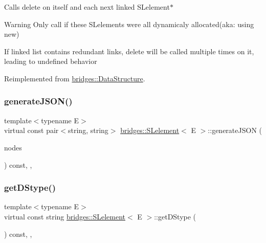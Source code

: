 Calls delete on itself and each next linked S\+Lelement$\ast$

\begin{DoxyWarning}{Warning}
Only call if these S\+Lelements were all dynamicaly allocated(aka\+: using new) 

If linked list contains redundant links, delete will be called multiple times on it, leading to undefined behavior 
\end{DoxyWarning}


Reimplemented from \mbox{\hyperlink{classbridges_1_1_data_structure_ac3ad75810fd77f0ad35b9b5123d2c8f8}{bridges\+::\+Data\+Structure}}.

\mbox{\label{classbridges_1_1_s_lelement_af154fd3038c46e53fe28cf65ab528ca9}} 
\subsubsection{\texorpdfstring{generate\+J\+S\+O\+N()}{generateJSON()}}
{\footnotesize\ttfamily template$<$typename E$>$ \\
virtual const pair$<$string, string$>$ \mbox{\hyperlink{classbridges_1_1_s_lelement}{bridges\+::\+S\+Lelement}}$<$ E $>$\+::generate\+J\+S\+ON (\begin{DoxyParamCaption}\item[{vector$<$ const \mbox{\hyperlink{classbridges_1_1_s_lelement}{S\+Lelement}}$<$ E $>$ $\ast$$>$}]{nodes }\end{DoxyParamCaption}) const\hspace{0.3cm}{\ttfamily [inline]}, {\ttfamily [protected]}, {\ttfamily [virtual]}}

\mbox{\label{classbridges_1_1_s_lelement_a136330b3481a47b3edb429f323274655}} 
\subsubsection{\texorpdfstring{get\+D\+Stype()}{getDStype()}}
{\footnotesize\ttfamily template$<$typename E$>$ \\
virtual const string \mbox{\hyperlink{classbridges_1_1_s_lelement}{bridges\+::\+S\+Lelement}}$<$ E $>$\+::get\+D\+Stype (\begin{DoxyParamCaption}{ }\end{DoxyParamCaption}) const\hspace{0.3cm}{\ttfamily [inline]}, {\ttfamily [override]}, {\ttfamily [virtual]}}

